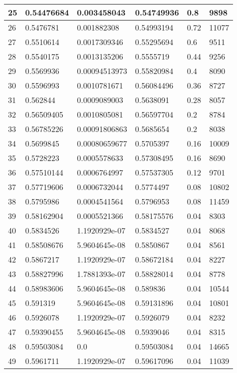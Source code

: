 \begin{longtable}{|l|l|l|l|l|l|}
25 & 0.54476684 & 0.003458043 & 0.54749936 & 0.8 & 9898 \\ \hline 
26 & 0.5476781 & 0.001882308 & 0.54993194 & 0.72 & 11077 \\ \hline 
27 & 0.5510614 & 0.0017309346 & 0.55295694 & 0.6 & 9511 \\ \hline 
28 & 0.5540175 & 0.0013135206 & 0.5555719 & 0.44 & 9256 \\ \hline 
29 & 0.5569936 & 0.00094513973 & 0.55820984 & 0.4 & 8090 \\ \hline 
30 & 0.5596993 & 0.0010781671 & 0.56084496 & 0.36 & 8727 \\ \hline 
31 & 0.562844 & 0.0009089003 & 0.5638091 & 0.28 & 8057 \\ \hline 
32 & 0.56509405 & 0.0010805081 & 0.56597704 & 0.2 & 8784 \\ \hline 
33 & 0.56785226 & 0.00091806863 & 0.5685654 & 0.2 & 8038 \\ \hline 
34 & 0.5699845 & 0.00080659677 & 0.5705397 & 0.16 & 10009 \\ \hline 
35 & 0.5728223 & 0.0005578633 & 0.57308495 & 0.16 & 8690 \\ \hline 
36 & 0.57510144 & 0.0006764997 & 0.57537305 & 0.12 & 9701 \\ \hline 
37 & 0.57719606 & 0.0006732044 & 0.5774497 & 0.08 & 10802 \\ \hline 
38 & 0.5795986 & 0.0004541564 & 0.5796953 & 0.08 & 11459 \\ \hline 
39 & 0.58162904 & 0.0005521366 & 0.58175576 & 0.04 & 8303 \\ \hline 
40 & 0.5834526 & 1.1920929e-07 & 0.5834527 & 0.04 & 8068 \\ \hline 
41 & 0.58508676 & 5.9604645e-08 & 0.5850867 & 0.04 & 8561 \\ \hline 
42 & 0.5867217 & 1.1920929e-07 & 0.58672184 & 0.04 & 8227 \\ \hline 
43 & 0.58827996 & 1.7881393e-07 & 0.58828014 & 0.04 & 8778 \\ \hline 
44 & 0.58983606 & 5.9604645e-08 & 0.589836 & 0.04 & 10544 \\ \hline 
45 & 0.591319 & 5.9604645e-08 & 0.59131896 & 0.04 & 10801 \\ \hline 
46 & 0.5926078 & 1.1920929e-07 & 0.5926079 & 0.04 & 8232 \\ \hline 
47 & 0.59390455 & 5.9604645e-08 & 0.5939046 & 0.04 & 8315 \\ \hline 
48 & 0.59503084 & 0.0 & 0.59503084 & 0.04 & 14665 \\ \hline 
49 & 0.5961711 & 1.1920929e-07 & 0.59617096 & 0.04 & 11039 \\ \hline 

\end{longtable}
